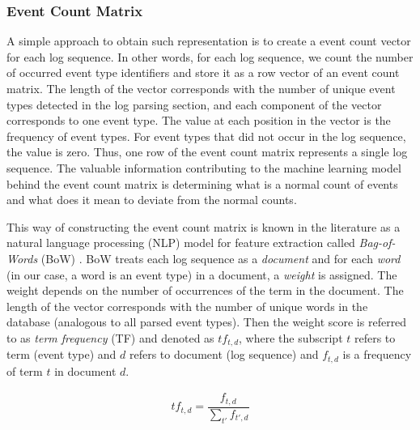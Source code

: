 \begin{figure}[!h] 
\end{figure}

\subsubsection*{Event Count Matrix}
A simple approach to obtain such representation is to create a event count vector for each log sequence. In other words, for each log sequence, we count the number of occurred event type identifiers and store it as a row vector of an event count matrix. The length of the vector corresponds with the number of unique event types detected in the log parsing section, and each component of the vector corresponds to one event type. The value at each position in the vector is the frequency of event types. For event types that did not occur in the log sequence, the value is zero. Thus, one row of the event count matrix represents a single log sequence. The valuable information contributing to the machine learning model behind the event count matrix is determining what is a normal count of events and what does it mean to deviate from the normal counts.


This way of constructing the event count matrix is known in the literature as a natural language processing (NLP) model for feature extraction called \textit{Bag-of-Words} (BoW) \cite{informationRetrieval2008}. BoW treats each log sequence as a \textit{document} and for each \textit{word} (in our case, a word is an event type) in a document, a \textit{weight} is assigned. The weight depends on the number of occurrences of the term in the document. The length of the vector corresponds with the number of unique words in the database (analogous to all parsed event types). Then the weight score is referred to as \textit{term frequency} (TF) and denoted as $tf_{t,d}$, where the subscript $t$ refers to term (event type) and $d$ refers to document (log sequence) and $f_{t,d}$ is a frequency of term $t$ in document $d$.

\begin{gather}
    tf_{t,d} = \dfrac{f_{t,d}}{\sum_{t'}f_{t', d}}
\end{gather}

